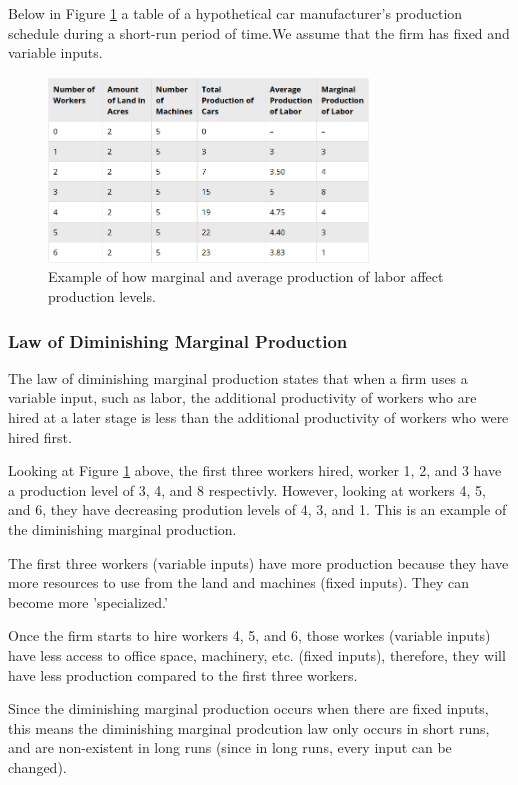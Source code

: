 \documentclass[a4paper, 12pt] {article}
\begin{document}
Below in Figure \ref{fig:car_manu} a table of a hypothetical car manufacturer's production
schedule during a short-run period of time.We assume that the firm has fixed
and variable inputs.

\begin{figure}[h]
    \centering
    \includegraphics[width=0.76\textwidth]{car_manufact.png}
    \caption{Example of how marginal and average production of labor affect
    production levels.}
    \label{fig:car_manu}
\end{figure}

\subsubsection{Law of Diminishing Marginal Production}
The law of diminishing marginal production states that when a firm uses a variable
input, such as labor, the additional productivity of workers who are hired at a 
later stage is less than the additional productivity of workers who were hired first.

Looking at Figure \ref{fig:car_manu} above, the first three workers hired,
worker 1, 2, and 3 have a production level of 3, 4, and 8 respectivly. However,
looking at workers 4, 5, and 6, they have decreasing prodution levels of 4, 3, 
and 1. This is an example of the diminishing marginal production.

The first three workers (variable inputs) have more production because they 
have more resources to use from the land and machines (fixed inputs). They can
become more 'specialized.'

Once the firm starts to hire workers 4, 5, and 6, those workes (variable inputs)
have less access to office space, machinery, etc. (fixed inputs), therefore, 
they will have less production compared to the first three workers.

Since the diminishing marginal production occurs when there are fixed inputs,
this means the diminishing marginal prodcution law only occurs in short runs,
and are non-existent in long runs (since in long runs, every input can be changed).
\end{document}
